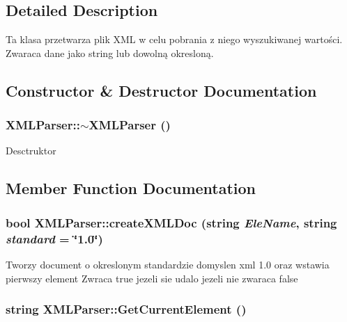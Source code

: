 \subsection{Detailed Description}
Ta klasa przetwarza plik XML w celu pobrania z niego wyszukiwanej wartości. Zwaraca dane jako string lub dowolną okresloną. 

\subsection{Constructor \& Destructor Documentation}
\hypertarget{classXMLParser_af833ecdb0e07ead08dfda925b4af86ad}{
\subsubsection[{$\sim$XMLParser}]{\setlength{\rightskip}{0pt plus 5cm}XMLParser::$\sim$XMLParser ()}}
\label{classXMLParser_af833ecdb0e07ead08dfda925b4af86ad}


Desctruktor 



\subsection{Member Function Documentation}
\hypertarget{classXMLParser_a73350cfff1a1dc52d8250df480f2b796}{
\subsubsection[{createXMLDoc}]{\setlength{\rightskip}{0pt plus 5cm}bool XMLParser::createXMLDoc (string {\em EleName}, \/  string {\em standard} = {\ttfamily \char`\"{}1.0\char`\"{}})}}
\label{classXMLParser_a73350cfff1a1dc52d8250df480f2b796}


Tworzy document o okreslonym standardzie domyslen xml 1.0 oraz wstawia pierwszy element Zwraca true jezeli sie udalo jezeli nie zwaraca false

\hypertarget{classXMLParser_a800ac601a76d6ced7b7f79268b95077e}{
\subsubsection[{GetCurrentElement}]{\setlength{\rightskip}{0pt plus 5cm}string XMLParser::GetCurrentElement ()}}
\label{classXMLParser_a800ac601a76d6ced7b7f79268b95077e}


